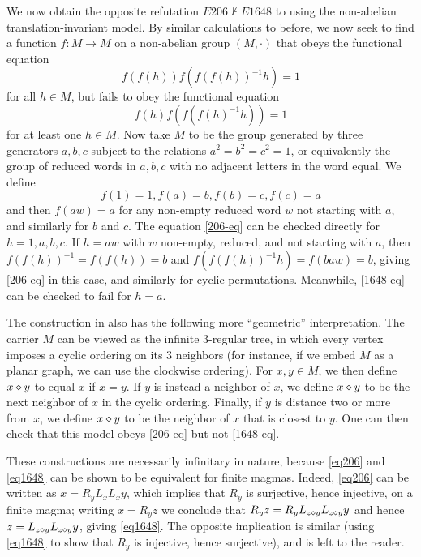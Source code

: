 \begin{example}\label{trans-nonab}  We now obtain the opposite refutation $E206 \not \vdash E1648$ to  using the non-abelian translation-invariant model.  By similar calculations to before, we now seek to find a function $f \colon M \to M$ on a non-abelian group $(M,\cdot)$ that obeys the functional equation
\begin{equation}\label{206-eq}
 f(f(h)) f(f(f(h))^{-1} h) = 1
\end{equation}
for all $h \in M$, but fails to obey the functional equation
\begin{equation}\label{1648-eq}
   f(h) f(f(f(h)^{-1} h)) = 1
\end{equation}
for at least one $h \in M$.  Now take $M$ to be the group generated by three generators $a,b,c$ subject to the relations $a^2=b^2=c^2=1$, or equivalently the group of reduced words in $a,b,c$ with no adjacent letters in the word equal.  We define
$$ f(1) = 1, f(a)=b, f(b) = c, f(c) = a$$
and then $f(aw)=a$ for any non-empty reduced word $w$ not starting with $a$, and similarly for $b$ and $c$.  The equation \eqref{206-eq} can be checked directly for $h=1,a,b,c$.  If $h=aw$ with $w$ non-empty, reduced, and not starting with $a$, then $f(f(h))^{-1} = f(f(h)) = b$ and $f(f(f(h))^{-1} h) = f(baw) = b$, giving \eqref{206-eq} in this case, and similarly for cyclic permutations. Meanwhile, \eqref{1648-eq} can be checked to fail for $h=a$.
\end{example}

\begin{remark}  The construction in  also has the following more ``geometric'' interpretation.  The carrier $M$ can be viewed as the infinite $3$-regular tree, in which every vertex imposes a cyclic ordering on its $3$ neighbors (for instance, if we embed $M$ as a planar graph, we can use the clockwise ordering).  For $x,y \in M$, we then define $x \diamond y$ to equal $x$ if $x=y$.  If $y$ is instead a neighbor of $x$, we define $x \diamond y$ to be the next neighbor of $x$ in the cyclic ordering.  Finally, if $y$ is distance two or more from $x$, we define $x \diamond y$ to be the neighbor of $x$ that is closest to $y$.  One can then check that this model obeys \eqref{206-eq} but not \eqref{1648-eq}.
\end{remark}

\begin{remark} These constructions are necessarily infinitary in nature, because \eqref{eq206} and \eqref{eq1648} can be shown to be equivalent for finite magmas. Indeed, \eqref{eq206} can be written as $x = R_y L_x L_x y$, which implies that $R_y$ is surjective, hence injective, on a finite magma; writing $x = R_y z$ we conclude that $R_y z = R_y L_{z \diamond y} L_{z \diamond y} y$ and hence $z = L_{z \diamond y} L_{z \diamond y} y$, giving \eqref{eq1648}.  The opposite implication is similar (using \eqref{eq1648} to show that $R_y$ is injective, hence surjective), and is left to the reader.
\end{remark}

